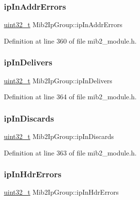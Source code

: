 \subsubsection{\texorpdfstring{ip\+In\+Addr\+Errors}{ipInAddrErrors}}
{\footnotesize\ttfamily \hyperlink{stdint_8h_a435d1572bf3f880d55459d9805097f62}{uint32\+\_\+t} Mib2\+Ip\+Group\+::ip\+In\+Addr\+Errors}



Definition at line 360 of file mib2\+\_\+module.\+h.

\mbox{\label{structMib2IpGroup_a3089df3fe15272634eaf7e736f411eb9}} 
\subsubsection{\texorpdfstring{ip\+In\+Delivers}{ipInDelivers}}
{\footnotesize\ttfamily \hyperlink{stdint_8h_a435d1572bf3f880d55459d9805097f62}{uint32\+\_\+t} Mib2\+Ip\+Group\+::ip\+In\+Delivers}



Definition at line 364 of file mib2\+\_\+module.\+h.

\mbox{\label{structMib2IpGroup_afd2fbb3fe7000314606d7e44c0b9e97b}} 
\subsubsection{\texorpdfstring{ip\+In\+Discards}{ipInDiscards}}
{\footnotesize\ttfamily \hyperlink{stdint_8h_a435d1572bf3f880d55459d9805097f62}{uint32\+\_\+t} Mib2\+Ip\+Group\+::ip\+In\+Discards}



Definition at line 363 of file mib2\+\_\+module.\+h.

\mbox{\label{structMib2IpGroup_a285d1d760299825dff75d284e4d3ed4f}} 
\subsubsection{\texorpdfstring{ip\+In\+Hdr\+Errors}{ipInHdrErrors}}
{\footnotesize\ttfamily \hyperlink{stdint_8h_a435d1572bf3f880d55459d9805097f62}{uint32\+\_\+t} Mib2\+Ip\+Group\+::ip\+In\+Hdr\+Errors}



